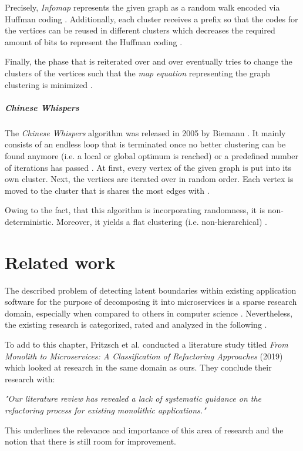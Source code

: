 \documentclass[12pt,a4paper]{report}
\begin{document}
Precisely, \textit{Infomap} represents the given graph as a random walk encoded
via Huffman coding \cite{huffman1952coding}.
Additionally, each cluster receives a prefix so that the codes for the vertices
can be reused in different clusters which decreases the required amount of bits
to represent the Huffman coding \cite{rosvall2008infomap}.

Finally, the phase that is reiterated over and over eventually tries to
change the clusters of the vertices such that the \textit{map equation}
representing the graph clustering is minimized \cite{rosvall2008infomap}.

\paragraph{Chinese Whispers \cite{biemann2006chinese}}
The \textit{Chinese Whispers} algorithm was released in 2005 by Biemann
\cite{biemann2006chinese}.
It mainly consists of an endless loop that is terminated once no better
clustering can be found anymore (i.e. a local or global optimum is reached)
or a predefined number of iterations has passed \cite{biemann2006chinese}.
At first, every vertex of the given graph is put into its own cluster.
Next, the vertices are iterated over in random order. Each vertex is moved
to the cluster that is shares the most edges with \cite{biemann2006chinese}.

Owing to the fact, that this algorithm is incorporating randomness,
it is non\hyp deterministic. Moreover, it yields a flat clustering
(i.e. non\hyp hierarchical) \cite{biemann2006chinese}.




\chapter{Related work} \label{chap:related}

The described problem of detecting latent boundaries within existing
application software for the purpose of decomposing it into microservices is
a sparse research domain, especially when compared to others
in computer science \cite{fritzsch2018monolith}.
Nevertheless, the existing research is categorized, rated and analyzed in the
following \textit{}.

To add to this chapter, Fritzsch et al. conducted a literature study titled
\textit{From Monolith to Microservices: A Classification of Refactoring Approaches} (2019)
\cite{fritzsch2018monolith} which looked at research in the same domain as ours.
They conclude their research with:
\begin{displayquote}
\emph{"Our literature review has revealed a lack of systematic guidance on the
refactoring process for existing monolithic applications."}~\cite{fritzsch2018monolith}
\end{displayquote}
This underlines the relevance and importance of this area of research and the
notion that there is still room for improvement.
\newpage
\end{document}
